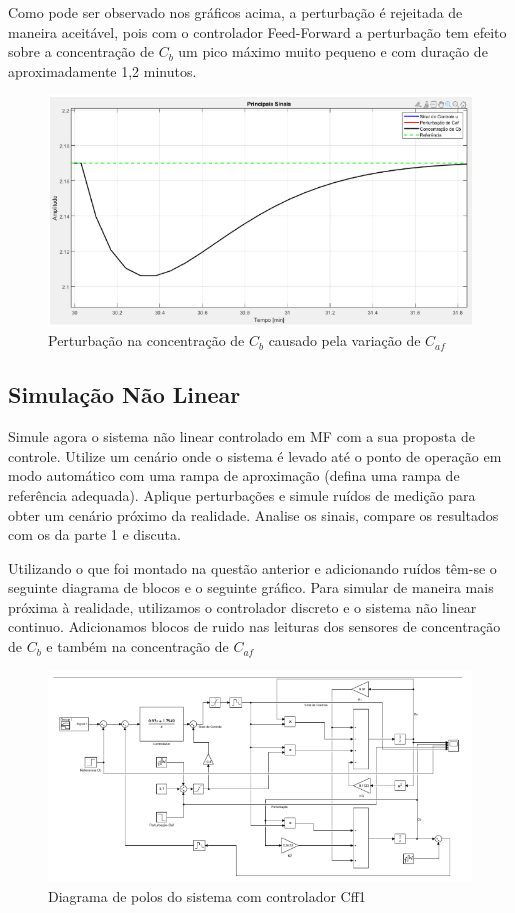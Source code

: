 \documentclass[a4paper,12pt]{article}
\begin{document}
Como pode ser observado nos gráficos acima, a perturbação é rejeitada de maneira aceitável, pois com o controlador Feed-Forward a perturbação tem efeito sobre a concentração de \(C_b\) um pico máximo muito pequeno e com duração de aproximadamente 
1,2 minutos.

\begin{figure} [H]
    \centering
    \includegraphics[width=0.8\linewidth]{image6.png}
    \caption{Perturbação na concentração de \(C_b\) causado pela variação de \(C_{af}\)}
   \end{figure}

\newpage
\subsection{Simulação Não Linear}

Simule agora o sistema não linear controlado em MF com a sua proposta de controle. 
Utilize um cenário onde o sistema é levado até o ponto de operação em modo 
automático com uma rampa de aproximação (defina uma rampa de referência 
adequada). Aplique perturbações e simule ruídos de medição para obter um cenário 
próximo da realidade. Analise os sinais, compare os resultados com os da parte 1 e 
discuta.

Utilizando o que foi montado na questão anterior e adicionando ruídos têm-se o seguinte diagrama de blocos e o seguinte gráfico. Para simular de maneira mais próxima à realidade, utilizamos o controlador discreto e o sistema não linear continuo. Adicionamos blocos de ruido nas leituras dos sensores de concentração de \(C_b\) e também na concentração de \(C_{af}\)

\begin{figure} [H]
    \centering
    \includegraphics[width=0.8\linewidth]{image1.png}
    \caption{Diagrama de polos do sistema com controlador Cff1}   
\end{figure}
\end{document}
